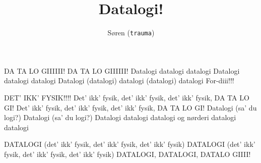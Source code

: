\documentclass[danish]{article}
\title{Datalogi!}
\author{Søren (\texttt{trauma})}
\begin{document}
\twocolumn[ %
\maketitle
]
\begin{song}
DA TA LO GIIIIII!
DA TA LO GIIIIII!
Datalogi datalogi datalogi
Datalogi datalogi datalogi
Datalogi (datalogi) datalogi (datalogi) datalogi For-diii!!!

DET' IKK' FYSIK!!!!
Det' ikk' fysik, det' ikk' fysik, det' ikk' fysik, DA TA LO GI!
Det' ikk' fysik, det' ikk' fysik, det' ikk' fysik, DA TA LO GI!
Datalogi (sa' du logi?) Datalogi (sa' du logi?)
Datalogi datalogi datalogi og nørderi datalogi datalogi

DATALOGI (det' ikk' fysik, det' ikk' fysik, det' ikk' fysik)
DATALOGI (det' ikk' fysik, det' ikk' fysik, det' ikk' fysik)
DATALOGI, DATALOGI, DATALO GIIII!

\end{song}
\end{document}
